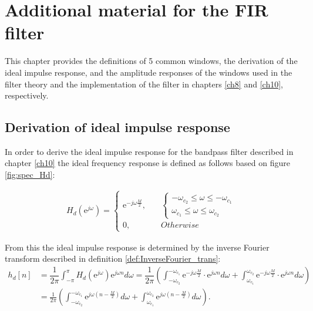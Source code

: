 \chapter{Additional material for the FIR filter}
This chapter provides the definitions of 5 common windows, the derivation of the ideal impulse response, and the amplitude responses of the windows used in the filter theory and the implementation of the filter in chapters \ref{ch8} and \ref{ch10}, respectively.


\clearpage

\section{Derivation of ideal impulse response}\label{appC}
In order to derive the ideal impulse response for the bandpass filter described in chapter \ref{ch10} the ideal frequency response is defined as follows based on figure \ref{fig:spec_Hd}:

\begin{align*}
H_d(\text{e}^{j\omega}) = \begin{cases}
\text{e}^{-j\omega\frac{M}{2}}, \quad &\begin{cases}
-\omega_{c_2} \leq \omega \leq -\omega_{c_1} \\
\omega_{c_1} \leq \omega \leq \omega_{c_2}
\end{cases} \\
0, \quad &Otherwise
\end{cases}
\end{align*}

From this the ideal impulse response is determined by the inverse Fourier transform described in definition \ref{def:InverseFourier_trans}:
\begin{align*}
h_d[n] &= \dfrac{1}{2\pi} \int_{-\pi}^\pi H_d(\text{e}^{j\omega}) \text{e}^{j\omega n} d\omega = \dfrac{1}{2\pi} \left(  \int_{-\omega_{c_2}}^{-\omega_{c_1}} \text{e}^{-j\omega \frac{M}{2}} \cdot \text{e}^{j \omega n} d\omega + \int_{\omega_{c_1}}^{\omega_{c_2}} \text{e}^{-j\omega \frac{M}{2}} \cdot \text{e}^{j \omega n} d\omega \right) \\
&= \frac{1}{2\pi} \left( \int_{-\omega_{c_2}}^{-\omega_{c_1}} \text{e}^{j\omega \left(n - \frac{M}{2} \right) } d\omega + \int_{\omega_{c_1}}^{\omega_{c_2}} \text{e}^{j\omega \left(n- \frac{M}{2} \right)} d\omega \right).
\end{align*}

